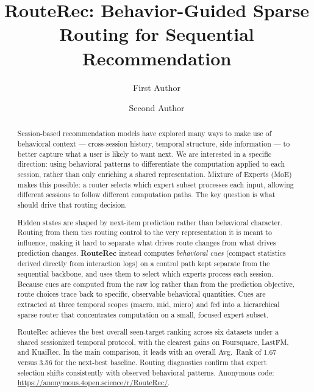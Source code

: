\documentclass[sigconf,review,anonymous]{acmart}
\begin{document}
\title[RouteRec for Sequential Recommendation]{RouteRec: Behavior-Guided Sparse Routing for Sequential Recommendation}

\author{First Author}

\author{Second Author}

\renewcommand{\shortauthors}{Author et al.}

\begin{abstract}
Session-based recommendation models have explored many ways to make use of behavioral context --- cross-session history, temporal structure, side information --- to better capture what a user is likely to want next. We are interested in a specific direction: using behavioral patterns to differentiate the computation applied to each session, rather than only enriching a shared representation. Mixture of Experts (MoE) makes this possible: a router selects which expert subset processes each input, allowing different sessions to follow different computation paths. The key question is what should drive that routing decision.

Hidden states are shaped by next-item prediction rather than behavioral character. Routing from them ties routing control to the very representation it is meant to influence, making it hard to separate what drives route changes from what drives prediction changes. \textbf{RouteRec} instead computes \emph{behavioral cues} (compact statistics derived directly from interaction logs) on a control path kept separate from the sequential backbone, and uses them to select which experts process each session. Because cues are computed from the raw log rather than from the prediction objective, route choices trace back to specific, observable behavioral quantities. Cues are extracted at three temporal scopes (macro, mid, micro) and fed into a hierarchical sparse router that concentrates computation on a small, focused expert subset.

RouteRec achieves the best overall seen-target ranking across six datasets under a shared sessionized temporal protocol, with the clearest gains on Foursquare, LastFM, and KuaiRec. In the main comparison, it leads with an overall Avg.~Rank of 1.67 versus 3.56 for the next-best baseline. Routing diagnostics confirm that expert selection shifts consistently with observed behavioral patterns. Anonymous code: \url{https://anonymous.4open.science/r/RouteRec/}.
\end{abstract}
\end{document}

